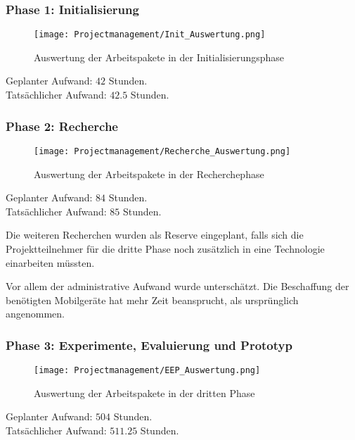 \subsubsection*{Phase 1: Initialisierung}
\begin{figure}[h!]
	\centering
	\texttt{[image: Projectmanagement/Init\_Auswertung.png]}
	\caption{Auswertung der Arbeitspakete in der Initialisierungsphase
	\label{figure:initevaluation}}
\end{figure}

Geplanter Aufwand: $42$ Stunden. \\
Tatsächlicher Aufwand: $42.5$ Stunden.

\clearpage 


\subsubsection*{Phase 2: Recherche}
\begin{figure}[h!]
	\centering
	\texttt{[image: Projectmanagement/Recherche\_Auswertung.png]}
	\caption{Auswertung der Arbeitspakete in der Recherchephase
	\label{figure:researchevaluation}}
\end{figure}

Geplanter Aufwand: $84$ Stunden. \\
Tatsächlicher Aufwand: $85$ Stunden.

Die weiteren Recherchen wurden als Reserve eingeplant, falls sich 
die Projektteilnehmer für die dritte Phase noch zusätzlich in eine Technologie
einarbeiten müssten. 

Vor allem der administrative Aufwand wurde unterschätzt. 
Die Beschaffung der benötigten Mobilgeräte hat mehr Zeit beansprucht, als 
ursprünglich angenommen.  

\clearpage

\subsubsection*{Phase 3: Experimente, Evaluierung und Prototyp}
\begin{figure}[h!]
	\centering
	\texttt{[image: Projectmanagement/EEP\_Auswertung.png]}
	\caption{Auswertung der Arbeitspakete in der dritten Phase
	\label{figure:eepevaluation}}
\end{figure}

Geplanter Aufwand: $504$ Stunden. \\
Tatsächlicher Aufwand: $511.25$ Stunden.

